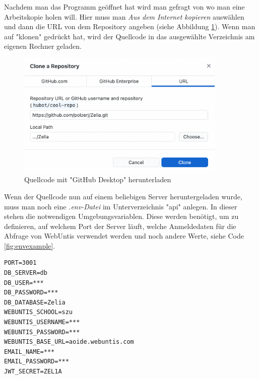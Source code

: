 \begin{minipage}{\textwidth}
    
    Nachdem man das Programm geöffnet hat wird man gefragt von wo man eine Arbeitskopie holen will. Hier muss man \emph{Aus dem Internet kopieren} auswählen und dann die URL von dem Repository angeben (siehe Abbildung \ref{fig:clonewithdesktop}). Wenn man auf "klonen" gedrückt hat, wird der Quellcode in das ausgewählte Verzeichnis am eigenen Rechner geladen. 
    
    \begin{figure}[H]
        \centering
        \includegraphics[width=100mm]{media/Handbuch/clone_gh.png}
        \caption{Quellcode mit "GitHub Desktop" herunterladen}
        \label{fig:clonewithdesktop}
    \end{figure}
\end{minipage}


Wenn der Quellcode nun auf einem beliebigen Server heruntergeladen wurde, muss man noch eine \emph{.env-Datei} im Unterverzeichnis "api" anlegen. In dieser stehen die notwendigen Umgebungsvariablen. Diese werden benötigt, um zu definieren, auf welchem Port der Server läuft, welche Anmeldedaten für die Abfrage von WebUntis verwendet werden und noch andere Werte, siehe Code \ref{fig:envexample}.


\begin{singlespace}
    \begin{lstlisting}[caption={Beispiel einer .env-Datei},label={fig:envexample},captionpos=b]
PORT=3001
DB_SERVER=db
DB_USER=***
DB_PASSWORD=***
DB_DATABASE=Zelia
WEBUNTIS_SCHOOL=szu
WEBUNTIS_USERNAME=***
WEBUNTIS_PASSWORD=***
WEBUNTIS_BASE_URL=aoide.webuntis.com
EMAIL_NAME=***
EMAIL_PASSWORD=***
JWT_SECRET=ZEL1A
    \end{lstlisting}
\end{singlespace}

